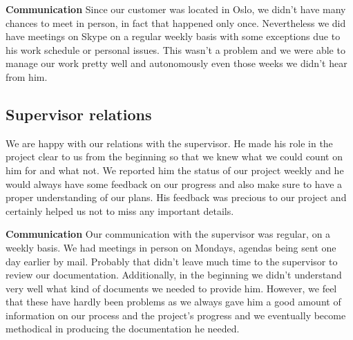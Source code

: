 \textbf{Communication}\newline
Since our customer was located in Oslo, we didn't have many chances to meet in person,
in fact that happened only once. Nevertheless we did have meetings on Skype on a regular weekly basis
with some exceptions due to his work schedule or personal issues.
This wasn't a problem and we were able to manage our work pretty well and autonomously
even those weeks we didn't hear from him.

\subsection{Supervisor relations}

We are happy with our relations with the supervisor.
He made his role in the project clear to us from the beginning so that we knew
what we could count on him for and what not.
We reported him the status of our project weekly and he would always have some feedback
on our progress and also make sure to have a proper understanding of our plans.
His feedback was precious to our project and certainly helped us not to miss any important details.

\textbf{Communication}\newline
Our communication with the supervisor was regular, on a weekly basis.
We had meetings in person on Mondays, agendas being sent one day earlier by mail.
Probably that didn't leave much time to the supervisor to review our documentation.
Additionally, in the beginning we didn't understand very well what kind of documents
we needed to provide him.
However, we feel that these have hardly been problems as we always gave him a
good amount of information on our process and the project's progress and we eventually
become methodical in producing the documentation he needed.

